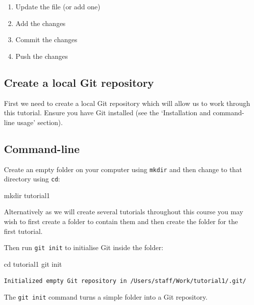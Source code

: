 \documentclass[
  letterpaper,
  DIV=11,
  numbers=noendperiod]{scrartcl}
\newenvironment{Shaded}{\begin{snugshade}}{\end{snugshade}}
\newcommand{\NormalTok}[1]{\textcolor[rgb]{0.00,0.23,0.31}{#1}}
\begin{document}
\begin{enumerate}
\def\labelenumi{\arabic{enumi}.}
\item
  Update the file (or add one)
\item
  Add the changes
\item
  Commit the changes
\item
  Push the changes
\end{enumerate}

\subsection{Create a local Git repository}\label{sec-local_git}

First we need to create a local Git repository which will allow us to
work through this tutorial. Ensure you have Git installed (see the
`Installation and command-line usage' section).

\subsection{Command-line}

Create an empty folder on your computer using \texttt{mkdir} and then
change to that directory using \texttt{cd}:

\begin{Shaded}
\begin{Highlighting}[]
\NormalTok{mkdir tutorial1}
\end{Highlighting}
\end{Shaded}

Alternatively as we will create several tutorials throughout this course
you may wish to first create a folder to contain them and then create
the folder for the first tutorial.

Then run \texttt{git\ init} to initialise Git inside the folder:

\begin{Shaded}
\begin{Highlighting}[]
\NormalTok{cd tutorial1}
\NormalTok{git init}
\end{Highlighting}
\end{Shaded}

\begin{verbatim}
Initialized empty Git repository in /Users/staff/Work/tutorial1/.git/
\end{verbatim}

The \texttt{git\ init} command turns a simple folder into a Git
repository.
\end{document}
